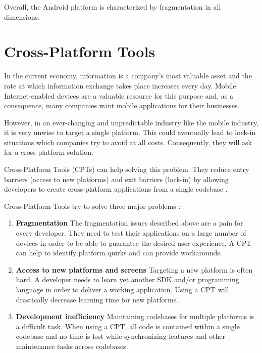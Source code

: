 Overall, the Android platform is characterized by fragmentation in all dimensions.

\section{Cross-Platform Tools}

In the current economy, information is a company's most valuable asset and the rate at which information exchange takes place increases every day. Mobile Internet-enabled devices are a valuable resource for this purpose and, as a consequence, many companies want mobile applications for their businesses.

However, in an ever-changing and unpredictable industry like the mobile industry, it is very unwise to target a single platform. This could eventually lead to lock-in situations which companies try to avoid at all costs. Consequently, they will ask for a cross-platform solution. 

Cross-Platform Tools (CPTs) can help solving this problem. They reduce entry barriers (access to new platforms) and exit barriers (lock-in) by allowing developers to create cross-platform applications from a single codebase \cite{VMCPT:2012}. 

Cross-Platform Tools try to solve three major problems \cite{VMCPT:2012}: 

\begin{enumerate}
    \item \textbf{Fragmentation} The fragmentation issues described above are a pain for every developer. They need to test their applications on a large number of devices in order to be able to guarantee the desired user experience. A CPT can help to identify platform quirks and can provide workarounds. 
    \item \textbf{Access to new platforms and screens} Targeting a new platform is often hard. A developer needs to learn yet another SDK and/or programming language in order to deliver a working application. Using a CPT will drastically decrease learning time for new platforms.
    \item \textbf{Development inefficiency} Maintaining codebases for multiple platforms is a difficult task. When using a CPT, all code is contained within a single codebase and no time is lost while synchronizing features and other maintenance tasks across codebases. 
\end{enumerate}



